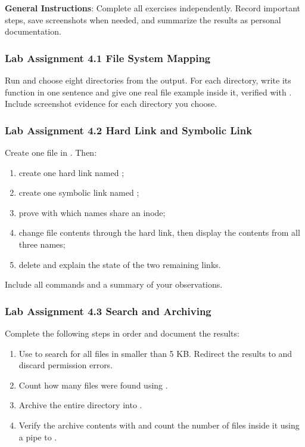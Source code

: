 \textbf{General Instructions}: Complete all exercises independently. Record important steps, save screenshots when needed, and summarize the results as personal documentation.

\subsubsection*{Lab Assignment 4.1 File System Mapping}
Run  and choose eight directories from the output. For each directory, write its function in one sentence and give one real file example inside it, verified with . Include screenshot evidence for each directory you choose.


\subsubsection*{Lab Assignment 4.2 Hard Link and Symbolic Link}
Create one file  in . Then:
\begin{enumerate}
    \item create one hard link named ;
    \item create one symbolic link named ;
    \item prove with  which names share an inode;
    \item change file contents through the hard link, then display the contents from all three names;
    \item delete  and explain the state of the two remaining links.
\end{enumerate}
Include all commands and a summary of your observations.


\subsubsection*{Lab Assignment 4.3 Search and Archiving}
Complete the following steps in order and document the results:
\begin{enumerate}
    \item Use  to search for all  files in  smaller than 5 KB. Redirect the results to  and discard permission errors.
    \item Count how many files were found using .
    \item Archive the entire  directory into .
    \item Verify the archive contents with  and count the number of files inside it using a pipe to .
\end{enumerate}
